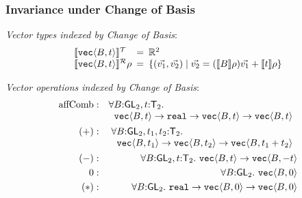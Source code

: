 \documentclass[xetex,serif,mathserif]{beamer}
\newcommand{\sepbar}{\mathrel|}
\newcommand{\SynGL}[1]{\mathsf{GL}_#1}
\newcommand{\SynTransl}[1]{\mathsf{T}_#1}
\newcommand{\tyPrim}[2]{\textup{\texttt{#1}}\langle #2 \rangle}
\newcommand{\tyPrimNm}[1]{\textup{\texttt{#1}}}
\newcommand{\sem}[1]{\llbracket #1 \rrbracket}
\newcommand{\tySem}[1]{\llbracket #1 \rrbracket^{\mathcal{T}}}
\newcommand{\rsem}[3]{\llbracket #1 \rrbracket^{\mathcal{R}}_{#2}{#3}}
\newenvironment{slide}[1]{\begin{frame}\frametitle{#1}}{\end{frame}}
\begin{document}
\begin{slide}{Invariance under Change of Basis}
  \textcolor{titlered}{\emph{Vector types indexed by Change of Basis}}:
  \begin{displaymath}
    \begin{array}{l@{\hspace{0.5em}=\hspace{0.5em}}l}
      \tySem{\tyPrim{vec}{B,t}} & \mathbb{R}^2
      \\ \rsem{\tyPrim{vec}{B,t}}{}\rho & \{ (\vec{v_1},\vec{v_2})
      \sepbar \vec{v_2} = (\sem{B}\rho)\vec{v_1} + \sem{t}\rho \}
    \end{array}
  \end{displaymath}

  \textcolor{titlered}{\emph{Vector operations indexed by Change of Basis}}:
  \begin{eqnarray*}
    \mathrm{affComb} & : &
    \begin{array}[t]{@{}l}
      \forall B \mathord: \SynGL{2}, t \mathord: \SynTransl{2}.\\
      \hspace{0.2cm} \tyPrim{vec}{B,t} \to \tyPrimNm{real} \to
      \tyPrim{vec}{B,t} \to \tyPrim{vec}{B,t}
    \end{array}
    \\
    (+) & : &
    \begin{array}[t]{@{}l}
      \forall B \mathord: \SynGL{2}, t_1,t_2 \mathord: \SynTransl{2}. \\
      \hspace{0.2cm}\tyPrim{vec}{B,t_1} \to \tyPrim{vec}{B,t_2} \to
      \tyPrim{vec}{B,t_1 + t_2}
    \end{array}
    \\
    (-) & : & \forall B \mathord: \SynGL{2}, t \mathord: \SynTransl{2}.\ \tyPrim{vec}{B,t} \to \tyPrim{vec}{B,-t} \\
    0 & : & \forall B \mathord: \SynGL{2}.\ \tyPrim{vec}{B,0} \\
    (*) & : & \forall B \mathord: \SynGL{2}.\ \tyPrimNm{real} \to \tyPrim{vec}{B,0} \to \tyPrim{vec}{B,0}
\end{eqnarray*}
\end{slide}
\end{document}
